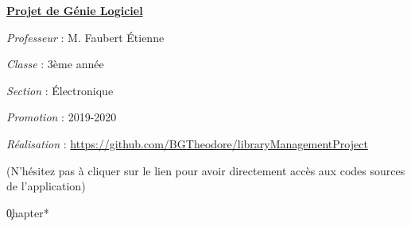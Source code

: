 \documentclass[a4paper,12pt]{report}
\begin{document}
\begin{center}
    \textbf{\underline{Projet de Génie Logiciel}} \par 
    \textit{Professeur} : M. Faubert Étienne \par 
    \textit{Classe} : 3ème année \par 
    \textit{Section} : Électronique \par 
    \textit{Promotion} : 2019-2020 \par 
    \textit{Réalisation} : \url{https://github.com/BGTheodore/libraryManagementProject}\par 
    (N'hésitez pas à cliquer sur le lien pour avoir directement accès aux codes 
    sources de l'application)
\end{center}


\tableofcontents

\c0hapter*{}















\end{document}
